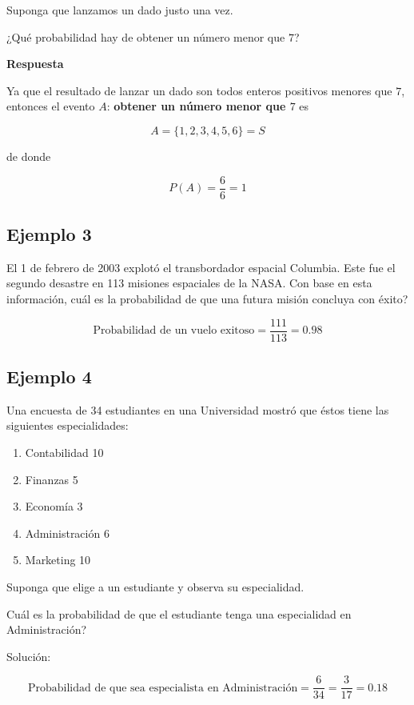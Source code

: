 \documentclass[
]{book}
\theoremstyle{definition}
\theoremstyle{definition}
\theoremstyle{definition}
\theoremstyle{definition}
\theoremstyle{remark}
\begin{document}
Suponga que lanzamos un dado justo una vez.

¿Qué probabilidad hay de obtener un número menor que \(7\)?

\textbf{Respuesta}

Ya que el resultado de lanzar un dado son todos enteros positivos menores que \(7\), entonces el evento \(A\): \textbf{obtener un número menor que \(7\)} es

\[
A=\{1,2,3,4,5,6\}=S
\]

de donde

\[
P(A)=\dfrac{6}{6}=1
\]

\hypertarget{ejemplo-3}{%
\subsection{Ejemplo 3}\label{ejemplo-3}}

El 1 de febrero de 2003 explotó el transbordador espacial Columbia. Este fue el segundo desastre en 113 misiones espaciales de la NASA. Con base en esta información, cuál es la probabilidad de que una futura misión concluya con éxito?

\[
\text{Probabilidad de un vuelo exitoso}=\dfrac{111}{113}=0.98
\]

\hypertarget{ejemplo-4}{%
\subsection{Ejemplo 4}\label{ejemplo-4}}

Una encuesta de 34 estudiantes en una Universidad mostró que éstos tiene las siguientes especialidades:

\begin{enumerate}
\def\labelenumi{\arabic{enumi})}
\item
  Contabilidad 10
\item
  Finanzas 5
\item
  Economía 3
\item
  Administración 6
\item
  Marketing 10
\end{enumerate}

Suponga que elige a un estudiante y observa su especialidad.

Cuál es la probabilidad de que el estudiante tenga una especialidad en Administración?

Solución:

\[
\text{Probabilidad de que sea especialista en Administración}=\dfrac{6}{34}=\dfrac{3}{17}=0.18
\]
\end{document}
